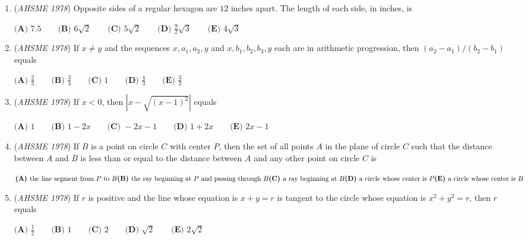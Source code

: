 \begin{enumerate}
 
 \[x=x^2+y^2 \    \ y=2xy\] 
is


 $\textbf{(A) }0\qquad \textbf{(B) }1\qquad \textbf{(C) }2\qquad \textbf{(D) }3\qquad  \textbf{(E) }4$


	\item (\textit{AHSME 1978}) Opposite sides of a regular hexagon are $12$ inches apart. The length of each side, in inches, is


 $\textbf{(A) }7.5\qquad \textbf{(B) }6\sqrt{2}\qquad \textbf{(C) }5\sqrt{2}\qquad \textbf{(D) }\frac{9}{2}\sqrt{3}\qquad \textbf{(E) }4\sqrt{3}$


	\item (\textit{AHSME 1978}) If $x\neq y$ and the sequences $x,a_1,a_2,y$ and $x,b_1,b_2,b_3,y$ each are in arithmetic progression, then $(a_2-a_1)/(b_2-b_1)$ equals


 $\textbf{(A) }\frac{2}{3}\qquad \textbf{(B) }\frac{3}{4}\qquad \textbf{(C) }1\qquad \textbf{(D) }\frac{4}{3}\qquad \textbf{(E) }\frac{3}{2}$


	\item (\textit{AHSME 1978}) If $x<0$, then $\left|x-\sqrt{(x-1)^2}\right|$ equals


 $\textbf{(A) }1\qquad \textbf{(B) }1-2x\qquad \textbf{(C) }-2x-1\qquad \textbf{(D) }1+2x\qquad  \textbf{(E) }2x-1$


	\item (\textit{AHSME 1978}) If $\mathit{B}$ is a point on circle $\mathit{C}$ with center $\mathit{P}$, then the set of all points $\mathit{A}$ in the plane of circle 
$\mathit{C}$ such that the distance between $\mathit{A}$ and $\mathit{B}$ is less than or equal to the distance between $\mathit{A}$ 
and any other point on circle $\mathit{C}$ is


 $\textbf{(A) }\text{the line segment from }P \text{ to }B\qquad\\ \textbf{(B) }\text{the ray beginning at }P \text{ and passing through }B\qquad\\ \textbf{(C) }\text{a ray beginning at }B\qquad\\ \textbf{(D) }\text{a circle whose center is }P\qquad\\ \textbf{(E) }\text{a circle whose center is }B$


	\item (\textit{AHSME 1978}) If $r$ is positive and the line whose equation is $x + y = r$ is tangent to the circle whose equation is $x^2 + y ^2 = r$, then $r$ equals


 $\textbf{(A) }\frac{1}{2}\qquad \textbf{(B) }1\qquad \textbf{(C) }2\qquad \textbf{(D) }\sqrt{2}\qquad  \textbf{(E) }2\sqrt{2}$



\end{enumerate}
